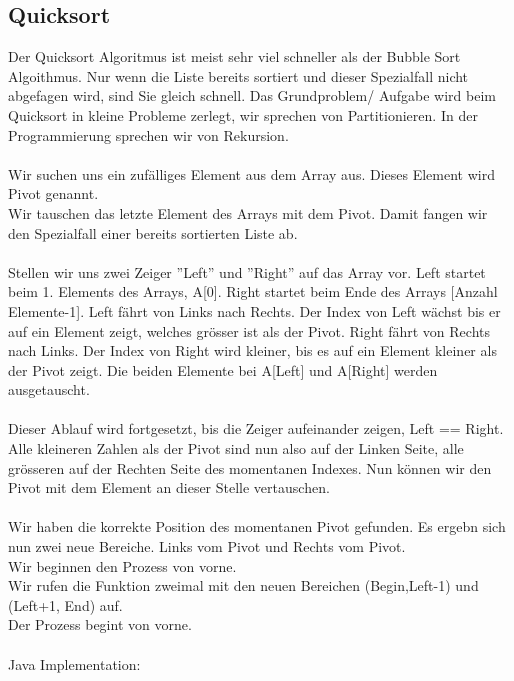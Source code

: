\documentclass[a4paper,10pt]{report}
\begin{document}
\subsection{Quicksort}
Der Quicksort Algoritmus ist meist sehr viel schneller als der Bubble Sort Algoithmus. Nur wenn die Liste bereits sortiert und dieser Spezialfall nicht abgefagen wird, sind Sie gleich schnell.
Das Grundproblem/ Aufgabe wird beim Quicksort in kleine Probleme zerlegt, wir sprechen von Partitionieren. In der Programmierung sprechen wir von Rekursion.\\
\\
Wir suchen uns ein zufälliges Element aus dem Array aus. Dieses Element wird Pivot genannt.\\
Wir tauschen das letzte Element des Arrays mit dem Pivot. Damit fangen wir den Spezialfall einer bereits sortierten Liste ab.\\
\\
Stellen wir uns zwei Zeiger ''Left'' und ''Right'' auf das Array vor. Left startet beim 1. Elements des Arrays, A[0]. Right startet beim Ende des Arrays [Anzahl Elemente-1]. Left fährt von Links nach Rechts. Der Index von Left wächst bis er auf ein Element zeigt, welches grösser ist als der Pivot. Right fährt von Rechts nach Links. Der Index von Right  wird kleiner, bis es auf ein Element kleiner als der Pivot zeigt. Die beiden Elemente bei A[Left] und A[Right] werden ausgetauscht.\\
\\
Dieser Ablauf wird fortgesetzt, bis die Zeiger aufeinander zeigen, Left == Right.\\
Alle kleineren Zahlen als der Pivot sind nun also auf der Linken Seite, alle grösseren auf der Rechten Seite des momentanen Indexes. Nun können wir den Pivot mit dem Element an dieser Stelle vertauschen.\\
\\
Wir haben die korrekte Position des momentanen Pivot gefunden.
Es ergebn sich nun zwei neue Bereiche. Links vom Pivot und Rechts vom Pivot.\\
Wir beginnen den Prozess von vorne.\\
Wir rufen die Funktion zweimal mit den neuen Bereichen (Begin,Left-1) und (Left+1, End) auf.\\
Der Prozess begint von vorne.\\
\\
Java Implementation:
\end{document}
